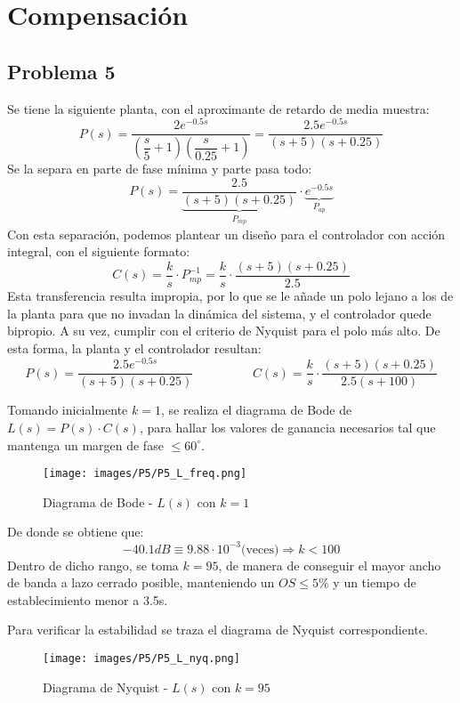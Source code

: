\documentclass[ca_tp2_main.tex]{subfiles}
\begin{document}
\section{Compensación}
\subsection{Problema 5}

Se tiene la siguiente planta, con el aproximante de retardo de media muestra:
\[
P(s) = \dfrac{2 e^{-0.5s}}{\left(\dfrac{s}{5} +1\right) \left(\dfrac{s}{0.25}+1\right)} = \dfrac{2.5 e^{-0.5s}}{(s+5)(s+0.25)}
\]
Se la separa en parte de fase mínima y parte pasa todo:
\[
P(s) = \underbrace{\dfrac{2.5}{(s+5)(s+0.25)}}_{P_{mp}} \cdot \underbrace{e^{-0.5s}}_{P_{ap}}
\]
Con esta separación, podemos plantear un diseño para el controlador con acción integral, con el siguiente formato:
\[
C(s) = \frac{k}{s} \cdot P^{-1}_{mp} = \frac{k}{s} \cdot \dfrac{(s+5)(s+0.25)}{2.5}
\]
Esta transferencia resulta impropia, por lo que se le añade un polo lejano a los de la planta para que no invadan la dinámica del sistema, y el controlador quede bipropio. A su vez, cumplir con el criterio de Nyquist para el polo más alto. De esta forma, la planta y el controlador resultan:
\[
P(s) = \dfrac{2.5 e^{-0.5s}}{(s+5)(s+0.25)} \hspace{2cm} C(s) = \frac{k}{s} \cdot \dfrac{(s+5)(s+0.25)}{2.5(s+100)}
\]

Tomando inicialmente $k=1$, se realiza el diagrama de Bode de $L(s)=P(s)\cdot C(s)$, para hallar los valores de ganancia necesarios tal que mantenga un margen de fase $\leq 60^{\circ}$.

\begin{figure}[H]
\centering
\texttt{[image: images/P5/P5\_L\_freq.png]}
\caption{Diagrama de Bode - $L(s)$ con $k=1$}
\end{figure}
\newpage
De donde se obtiene que:
\[
-40.1dB \equiv 9.88\cdot 10^{-3} \textrm{(veces)} \Longrightarrow k < 100
\]
Dentro de dicho rango, se toma $k=95$, de manera de conseguir el mayor ancho de banda a lazo cerrado posible, manteniendo un $OS \leq 5\%$ y un tiempo de establecimiento menor a 3.5s. 
\par
Para verificar la estabilidad se traza el diagrama de Nyquist correspondiente.

\begin{figure}[H]
\centering
\texttt{[image: images/P5/P5\_L\_nyq.png]}
\caption{Diagrama de Nyquist - $L(s)$ con $k=95$}
\end{figure}
\end{document}
